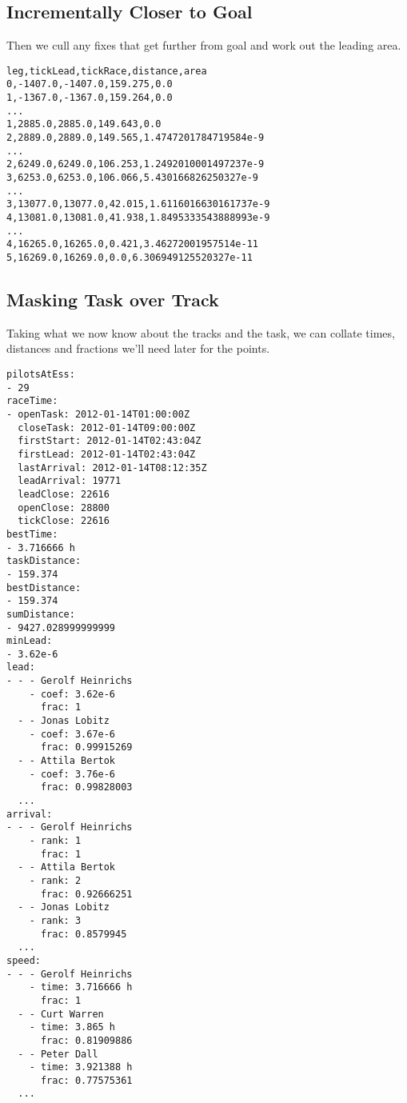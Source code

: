 \documentclass[gap.tex]{subfiles}
\begin{document}
\subsection{Incrementally Closer to Goal}

Then we cull any fixes that get further from goal and work out the leading area.

\begin{lstlisting}[caption={Fixes getting closer to goal with leading area, rows of \texttt{*.discard-further.csv}}]
leg,tickLead,tickRace,distance,area
0,-1407.0,-1407.0,159.275,0.0
1,-1367.0,-1367.0,159.264,0.0
...
1,2885.0,2885.0,149.643,0.0
2,2889.0,2889.0,149.565,1.4747201784719584e-9
...
2,6249.0,6249.0,106.253,1.2492010001497237e-9
3,6253.0,6253.0,106.066,5.430166826250327e-9
...
3,13077.0,13077.0,42.015,1.6116016630161737e-9
4,13081.0,13081.0,41.938,1.8495333543888993e-9
...
4,16265.0,16265.0,0.421,3.46272001957514e-11
5,16269.0,16269.0,0.0,6.306949125520327e-11
\end{lstlisting}

\newpage
\subsection{Masking Task over Track}

Taking what we now know about the tracks and the task, we can collate times,
distances and fractions we'll need later for the points.

\begin{lstlisting}[caption={Collated items of \texttt{*.mask-track.yaml}}]
pilotsAtEss:
- 29
raceTime:
- openTask: 2012-01-14T01:00:00Z
  closeTask: 2012-01-14T09:00:00Z
  firstStart: 2012-01-14T02:43:04Z
  firstLead: 2012-01-14T02:43:04Z
  lastArrival: 2012-01-14T08:12:35Z
  leadArrival: 19771
  leadClose: 22616
  openClose: 28800
  tickClose: 22616
bestTime:
- 3.716666 h
taskDistance:
- 159.374
bestDistance:
- 159.374
sumDistance:
- 9427.028999999999
minLead:
- 3.62e-6
lead:
- - - Gerolf Heinrichs
    - coef: 3.62e-6
      frac: 1
  - - Jonas Lobitz
    - coef: 3.67e-6
      frac: 0.99915269
  - - Attila Bertok
    - coef: 3.76e-6
      frac: 0.99828003
  ...
arrival:
- - - Gerolf Heinrichs
    - rank: 1
      frac: 1
  - - Attila Bertok
    - rank: 2
      frac: 0.92666251
  - - Jonas Lobitz
    - rank: 3
      frac: 0.8579945
  ...
speed:
- - - Gerolf Heinrichs
    - time: 3.716666 h
      frac: 1
  - - Curt Warren
    - time: 3.865 h
      frac: 0.81909886
  - - Peter Dall
    - time: 3.921388 h
      frac: 0.77575361
  ...
\end{lstlisting}
\end{document}
